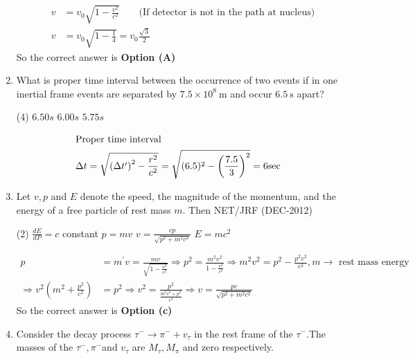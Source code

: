 \begin{enumerate}
\begin{answer}
\begin{align*}
v&=v_{0} \sqrt{1-\frac{v^{2}}{c^{2}}}\quad \quad
\text{(If detector is not in the path at nucleus)}\\
v&=v_{0} \sqrt{1-\frac{1}{4}}=v_{0} \frac{\sqrt{3}}{2}
\end{align*}
So the correct answer is \textbf{Option (A)}
\end{answer}
	\item What is proper time interval between the occurrence of two events if in one inertial frame events are separated by $7.5 \times 10^{8} \mathrm{~m}$ and occur $6.5 \mathrm{~s}$ apart?
{	}
\begin{tasks}(4)
\task[\textbf{A.}] $6.50 s$
\task[\textbf{B.}] $6.00 s$
\task[\textbf{C.}] $5.75 s$
\task[\textbf{D.}] 
\end{tasks}
\begin{answer}
\begin{align*}
\intertext{Proper time interval}
\Delta t&=\sqrt{\left(\Delta t^{\prime}\right)^{2}-\frac{r^{2}}{c^{2}}}=\sqrt{(6.5)^{2}-\left(\frac{7.5}{3}\right)^{2}}=6 \mathrm{sec}
\end{align*}
\end{answer}
	\item Let $v, p$ and $E$ denote the speed, the magnitude of the momentum, and the energy of a free particle of rest mass $m$. Then
	{NET/JRF (DEC-2012)}
	 \begin{tasks}(2)
		\task[\textbf{a.}]$\frac{d E}{d P}=c$ constant
		\task[\textbf{b.}] $p=m v$
		\task[\textbf{c.}]$v=\frac{c p}{\sqrt{p^{2}+m^{2} c^{2}}}$
		\task[\textbf{d.}] $E=m c^{2}$
	\end{tasks}
\begin{answer}
	\begin{align*}
	p&=m^{\prime} v=\frac{m v}{\sqrt{1-\frac{v^{2}}{c^{2}}}} \Rightarrow p^{2}=\frac{m^{2} v^{2}}{1-\frac{v^{2}}{c^{2}}} \Rightarrow m^{2} v^{2}=p^{2}-\frac{p^{2} v^{2}}{c^{2}}, m \rightarrow \text { rest mass energy }\\
	\Rightarrow v^{2}\left(m^{2}+\frac{p^{2}}{c^{2}}\right)&=p^{2} \Rightarrow v^{2}=\frac{p^{2}}{\frac{m^{2} c^{2}+p^{2}}{c^{2}}} \Rightarrow v=\frac{p c}{\sqrt{p^{2}+m^{2} c^{2}}}
	\end{align*}
	So the correct answer is \textbf{Option (c)}
\end{answer}
	\item Consider the decay process $\tau^{-} \rightarrow \pi^{-}+v_{\tau}$ in the rest frame of the $\tau^{-} .$The masses of the $\tau^{-}, \pi^{-}$and $v_{\tau}$ are $M_{\tau}, M_{\pi}$ and zero respectively.\\\\

\end{enumerate}
